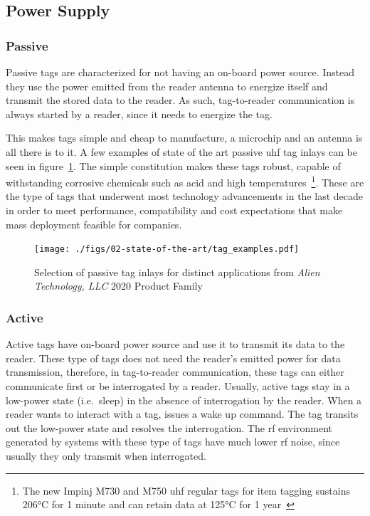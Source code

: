 \subsection{Power Supply}

\subsubsection{Passive}

Passive tags are characterized for not having an on-board power source. 
Instead they use the power emitted from the reader antenna to energize itself and transmit the stored data to the reader.
As such, tag-to-reader communication is always started by a reader, since it needs to energize the tag.

This makes tags simple and cheap to manufacture, a microchip and an antenna is all there is to it. A few examples of state of the art passive \ac{uhf} tag inlays can be seen in figure~\ref{fig:alienAlienProductFamily2020}.
The simple constitution makes these tags robust, capable of withstanding corrosive chemicals such as acid and high temperatures~\footnote{The new Impinj M730 and M750 \ac{uhf} regular tags for item tagging sustains \ang{206}C for 1 minute and can retain data at \ang{125}C for 1 year~\cite[Tab. 18]{ImpinjM730M750}}.
These are the type of tags that underwent most technology advancements in the last decade in order to meet performance, compatibility and cost expectations that make mass deployment feasible for companies.

\begin{figure}[!ht]
    \centering
    \texttt{[image: ./figs/02-state-of-the-art/tag\_examples.pdf]}
    \caption{Selection of passive tag inlays for distinct applications from \textit{Alien Technology, LLC} 2020 Product Family~\cite{alienAlienProductFamily2020}} 
    \label{fig:alienAlienProductFamily2020}
\end{figure}

\subsubsection{Active}

Active tags have on-board power source and use it to transmit its data to the reader.
These type of tags does not need the reader's emitted power for data transmission, therefore, in tag-to-reader communication, these tags can either communicate first or be interrogated by a reader.
Usually, active tags stay in a low-power state (i.e.\ sleep) in the absence of interrogation by the reader. When a reader wants to interact with a tag, issues a wake up command. The tag transits out the low-power state and resolves the interrogation.
The \ac{rf} environment generated by systems with these type of tags have much lower \ac{rf} noise, since usually
 they only transmit when interrogated.

